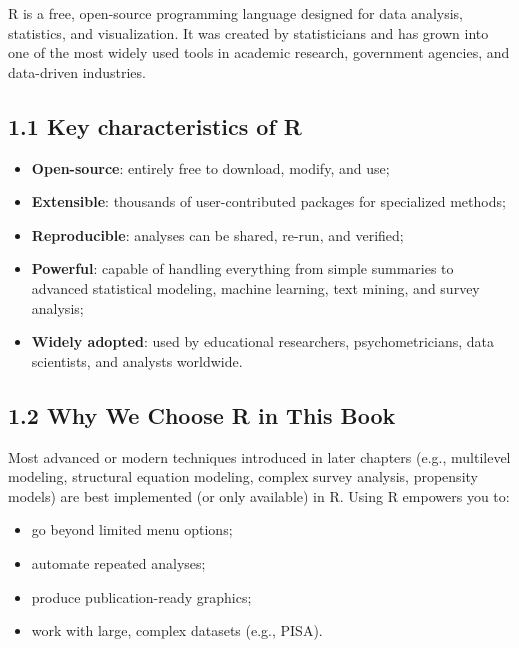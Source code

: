\documentclass[
  letterpaper,
  DIV=11,
  numbers=noendperiod]{scrreprt}
\begin{document}

R is a free, open-source programming language designed for data
analysis, statistics, and visualization. It was created by statisticians
and has grown into one of the most widely used tools in academic
research, government agencies, and data-driven industries.

\subsection*{1.1 Key characteristics of
R}\label{key-characteristics-of-r}

\begin{itemize}
\item
  \textbf{Open-source}: entirely free to download, modify, and use;
\item
  \textbf{Extensible}: thousands of user-contributed packages for
  specialized methods;
\item
  \textbf{Reproducible}: analyses can be shared, re-run, and verified;
\item
  \textbf{Powerful}: capable of handling everything from simple
  summaries to advanced statistical modeling, machine learning, text
  mining, and survey analysis;
\item
  \textbf{Widely adopted}: used by educational researchers,
  psychometricians, data scientists, and analysts worldwide.
\end{itemize}

\subsection*{1.2 Why We Choose R in This
Book}\label{why-we-choose-r-in-this-book}

Most advanced or modern techniques introduced in later chapters (e.g.,
multilevel modeling, structural equation modeling, complex survey
analysis, propensity models) are best implemented (or only available) in
R. Using R empowers you to:

\begin{itemize}
\item
  go beyond limited menu options;
\item
  automate repeated analyses;
\item
  produce publication-ready graphics;
\item
  work with large, complex datasets (e.g., PISA).
\end{itemize}
\end{document}
